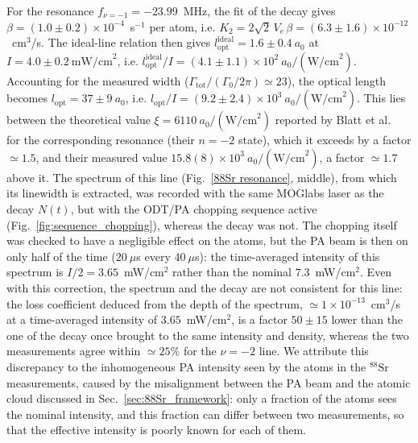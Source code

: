 For the resonance $f_{\nu=-1}=-23.99$~MHz, the fit of the decay gives
$\beta=(1.0\pm0.2)\times10^{-4}$~s$^{-1}$ per atom, i.e.
$K_2=2\sqrt{2}\,V_e\,\beta=(6.3\pm1.6)\times10^{-12}$~cm$^3$/s. The ideal-line relation then gives
$l_{\text{opt}}^{\text{ideal}} = 1.6\pm0.4~a_0$ at $I = 4.0\pm0.2~\text{mW/cm}^2$, i.e.
$l_{\text{opt}}^{\text{ideal}}/I = (4.1\pm1.1)\times10^2~a_0/(\text{W/cm}^2)$.
Accounting for the measured width ($\Gamma_{\text{tot}}/(\Gamma_0/2\pi) \simeq 23$), the
optical length becomes $l_{\text{opt}} = 37\pm9~a_0$, i.e.
$l_{\text{opt}}/I = (9.2\pm2.4)\times10^3~a_0/(\text{W/cm}^2)$. This lies between the
theoretical value $\xi = 6110~a_0/(\text{W/cm}^2)$ reported by Blatt et
al.~\cite{blatt_systematic_2011} for the corresponding resonance (their $n=-2$ state),
which it exceeds by a factor $\simeq1.5$, and their measured value
$15.8(8)\times10^3~a_0/(\text{W/cm}^2)$, a factor $\simeq1.7$ above it.
The spectrum of this line (Fig.~\ref{88Sr resonance}, middle), from which its linewidth is
extracted, was recorded with the same MOGlabs laser as the decay $N(t)$, but with the ODT/PA
chopping sequence active (Fig.~\ref{fig:sequence_chopping}), whereas the decay was not. The
chopping itself was checked to have a negligible effect on the atoms, but the PA beam is then
on only half of the time ($20~\mu$s every $40~\mu$s): the time-averaged intensity of this
spectrum is $I/2 = 3.65$~mW/cm$^2$ rather than the nominal $7.3$~mW/cm$^2$.
Even with this correction, the spectrum and the decay are not consistent for this line: the
loss coefficient deduced from the depth of the spectrum, $\simeq1\times10^{-13}$~cm$^3$/s
at a time-averaged intensity of $3.65$~mW/cm$^2$, is a factor $50\pm15$ lower than the one
of the decay once brought to the same intensity and density, whereas the two measurements
agree within $\simeq25\%$ for the $\nu=-2$ line. We attribute this discrepancy to the
inhomogeneous PA intensity seen by the atoms in the $^{88}\text{Sr}$ measurements, caused by
the misalignment between the PA beam and the atomic cloud discussed in
Sec.~\ref{sec:88Sr_framework}: only a fraction of the atoms sees the nominal intensity, and
this fraction can differ between two measurements, so that the effective intensity is poorly
known for each of them.

